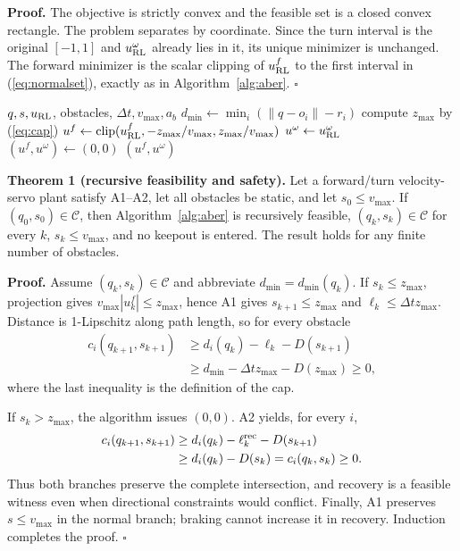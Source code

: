 \documentclass[letterpaper]{article}
\begin{document}
\textbf{Proof.}
The objective is strictly convex and the feasible set is a closed convex
rectangle.  The problem separates by coordinate.  Since the turn interval is
the original $[-1,1]$ and $u_{\rm RL}^\omega$ already lies in it, its unique
minimizer is unchanged.  The forward minimizer is the scalar clipping of
$u_{\rm RL}^f$ to the first interval in (\ref{eq:normalset}), exactly as in
Algorithm~\ref{alg:aber}. $\square$

\begin{algorithm}[t]
\caption{ABER forward/turn projection}
\label{alg:aber}
\begin{algorithmic}[1]
\REQUIRE $q,s,u_{\rm RL}$, obstacles, $\Delta t,v_{\max},a_b$
\STATE $d_{\min}\leftarrow\min_i(\|q-o_i\|-r_i)$
\STATE compute $z_{\max}$ by (\ref{eq:cap})
  \STATE $u^f\leftarrow\operatorname{clip}(u^f_{\rm RL},-z_{\max}/v_{\max},z_{\max}/v_{\max})$
  \STATE $u^\omega\leftarrow u^\omega_{\rm RL}$
\ELSE
  \STATE $(u^f,u^\omega)\leftarrow(0,0)$ 
\ENDIF
\RETURN $(u^f,u^\omega)$
\end{algorithmic}
\end{algorithm}

\textbf{Theorem 1 (recursive feasibility and safety).}
Let a forward/turn velocity-servo plant satisfy A1--A2, let all obstacles be
static, and let $s_0\le v_{\max}$.  If $(q_0,s_0)\in\mathcal C$, then
Algorithm~\ref{alg:aber} is recursively feasible,
$(q_k,s_k)\in\mathcal C$ for every $k$, $s_k\le v_{\max}$, and no keepout is
entered.  The result holds for any finite number of obstacles.

\textbf{Proof.}
Assume $(q_k,s_k)\in\mathcal C$ and abbreviate $d_{\min}=d_{\min}(q_k)$.
If $s_k\le z_{\max}$, projection gives
$v_{\max}|u_k^f|\le z_{\max}$, hence A1 gives $s_{k+1}\le z_{\max}$ and
$\ell_k\le\Delta t z_{\max}$.  Distance is 1-Lipschitz along path length, so
for every obstacle
\begin{align}
 c_i(q_{k+1},s_{k+1})
 &\ge d_i(q_k)-\ell_k-D(s_{k+1})\\
 &\ge d_{\min}-\Delta t z_{\max}-D(z_{\max})\ge0,        \label{eq:normalproof}
\end{align}
where the last inequality is the definition of the cap.

If $s_k>z_{\max}$, the algorithm issues $(0,0)$.  A2 yields, for every $i$,
\begin{equation}
\begin{aligned}
c_i(q_{k+1},s_{k+1})
 &\ge d_i(q_k)-\ell_k^{\rm rec}-D(s_{k+1})\\
 &\ge d_i(q_k)-D(s_k)=c_i(q_k,s_k)\ge0.
\end{aligned}                                                   \label{eq:recproof}
\end{equation}
Thus both branches preserve the complete intersection, and recovery is a
feasible witness even when directional constraints would conflict.  Finally,
A1 preserves $s\le v_{\max}$ in the normal branch; braking cannot increase it
in recovery.  Induction completes the proof. $\square$
\end{document}

